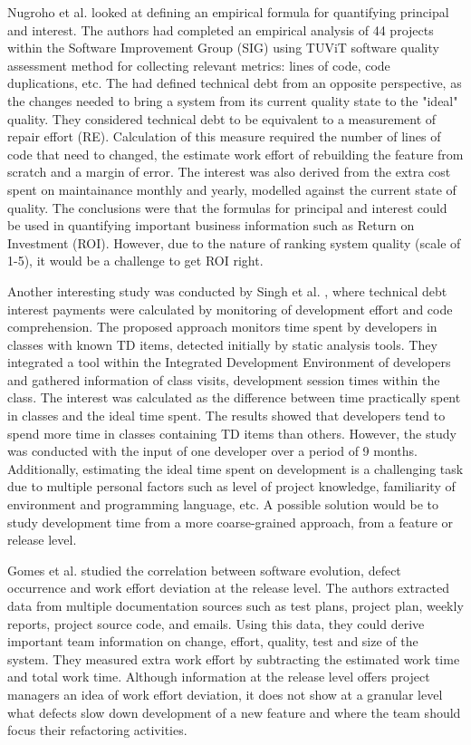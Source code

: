 \documentclass{mprop}
\begin{document}
Nugroho et al. \cite{Nugroho2011} looked at defining an empirical formula for
quantifying principal and interest. The authors had completed an empirical
analysis of 44 projects within the Software Improvement Group (SIG) using TUViT
software quality assessment method for collecting relevant metrics: lines of
code, code duplications, etc. The had defined technical debt from an opposite
perspective, as the changes needed to bring a system from its current quality
state to the "ideal" quality. They considered technical debt to be equivalent to
a measurement of repair effort (RE). Calculation of this measure required the
number of lines of code that need to changed, the estimate work effort of
rebuilding the feature from scratch and a margin of error. The interest was also
derived from the extra cost spent on maintainance monthly and yearly, modelled
against the current state of quality. The conclusions were that the formulas for
principal and interest could be used in quantifying important business
information such as Return on Investment (ROI). However, due to the nature of
ranking system quality (scale of 1-5), it would be a challenge to get ROI right.


Another interesting study was conducted by Singh et al. \cite{Singh2014}, where
technical debt interest payments were calculated by monitoring of development
effort and code comprehension. The proposed approach monitors time spent by
developers in classes with known TD items, detected initially by static analysis
tools. They integrated a tool within the Integrated Development Environment of
developers and gathered information of class visits, development session times
within the class. The interest was calculated as the difference between time
practically spent in classes and the ideal time spent. The results showed that
developers tend to spend more time in classes containing TD items than others.
However, the study was conducted with the input of one developer over a period
of 9 months. Additionally, estimating the ideal time spent on development is a
challenging task due to multiple personal factors such as level of project
knowledge, familiarity of environment and programming language, etc. A possible
solution would be to study development time from a more coarse-grained approach,
from a feature or release level.

Gomes et al. \cite{Gomes2011} studied the correlation between software
evolution, defect occurrence and work effort deviation at the release level. The
authors extracted data from multiple documentation sources such as test plans,
project plan, weekly reports, project source code, and emails. Using this data,
they could derive important team information on change, effort, quality, test
and size of the system. They measured extra work effort by subtracting the
estimated work time and total work time. Although information at the release
level offers project managers an idea of work effort deviation, it does not show
at a granular level what defects slow down development of a new feature and
where the team should focus their refactoring activities.
\end{document}
